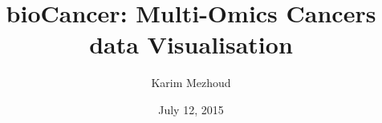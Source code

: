 \documentclass[a4paper]{article}
\begin{document}



\title{bioCancer: Multi-Omics Cancers data Visualisation}
\author{Karim Mezhoud}
\date{July 12, 2015}
\maketitle



\end{document}
